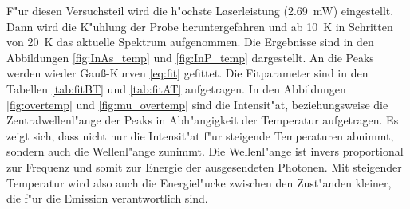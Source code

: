 F"ur diesen Versuchsteil wird die h"ochste Laserleistung (\SI{2.69}{\milli\watt}) eingestellt.
Dann wird die K"uhlung der Probe heruntergefahren und ab \SI{10}{\kelvin} in Schritten von \SI{20}{\kelvin} das aktuelle Spektrum aufgenommen.
Die Ergebnisse sind in den Abbildungen \vref{fig:InAs_temp} und \vref{fig:InP_temp} dargestellt.
An die Peaks werden wieder Gau\ss-Kurven \eqref{eq:fit} gefittet.
Die Fitparameter sind in den Tabellen \vref{tab:fitBT} und \vref{tab:fitAT} aufgetragen.
In den Abbildungen \vref{fig:overtemp} und \vref{fig:mu_overtemp} sind die Intensit"at, beziehungsweise die Zentralwellenl"ange der Peaks in Abh"angigkeit der Temperatur aufgetragen.
Es zeigt sich, dass nicht nur die Intensit"at f"ur steigende Temperaturen abnimmt, sondern auch die Wellenl"ange zunimmt.
Die Wellenl"ange ist invers proportional zur Frequenz und somit zur Energie der ausgesendeten Photonen.
Mit steigender Temperatur wird also auch die Energiel"ucke zwischen den Zust"anden kleiner, die f"ur die Emission verantwortlich sind.